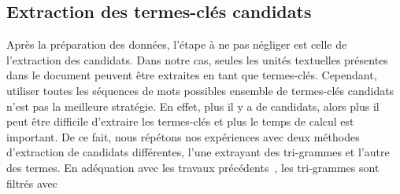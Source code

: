   \subsection{Extraction des termes-clés candidats}
  \label{subsec:extraction_des_termes_cles_candidats}
    Après la préparation des données, l'étape à ne pas négliger est celle
    de l'extraction des candidats. Dans notre cas, seules les unités textuelles
    présentes dans le document peuvent être extraites en tant que termes-clés.
    Cependant, utiliser toutes les séquences de mots possibles ensemble de
    termes-clés candidats n'est pas la meilleure stratégie. En effet, plus il y
    a de candidats, alors plus il peut être difficile d'extraire les termes-clés
    et plus le temps de calcul est important. De ce fait, nous répétons nos
    expériences avec deux méthodes d'extraction de candidats différentes, l'une
    extrayant des tri-grammes et l'autre des termes. En adéquation avec les
    travaux précédents~\cite{witten1999kea}, les tri-grammes sont filtrés avec
